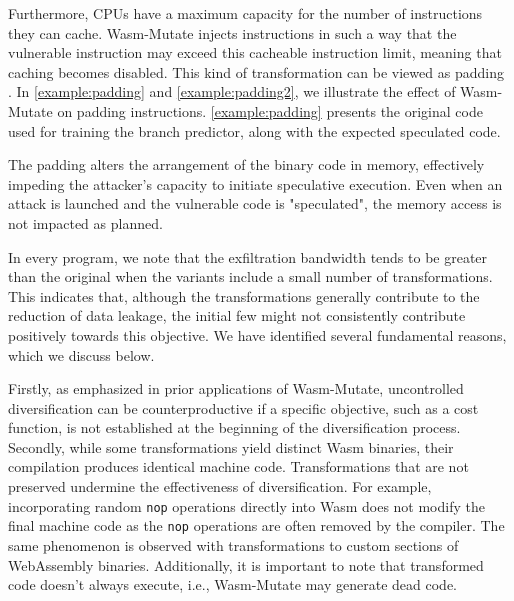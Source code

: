 \documentclass[sigplan,screen]{acmart}
\newcommand{\tool}{{\sc Wasm-Mutate}\xspace}
\newcommand{\wasm}{Wasm\xspace}
\newcommand{\Wasm}{WebAssembly\xspace}
\begin{document}
Furthermore, CPUs have a maximum capacity for the number of instructions they can cache.
\tool injects instructions in such a way that the vulnerable instruction may exceed this cacheable instruction limit, meaning that caching becomes disabled.
This kind of transformation can be viewed as padding \cite{padding}.
In \autoref{example:padding} and \autoref{example:padding2}, we illustrate the effect of \tool on padding instructions.
\autoref{example:padding} presents the original code used for training the branch predictor, along with the expected speculated code.



The padding alters the arrangement of the binary code in memory, effectively impeding the attacker's capacity to initiate speculative execution.
Even when an attack is launched and the vulnerable code is "speculated", the memory access is not impacted as planned.


In every program, we note that the exfiltration bandwidth tends to be greater than the original when the variants include a small number of transformations.
This indicates that, although the transformations generally contribute to the reduction of data leakage, the initial few might not consistently contribute positively towards this objective.
We have identified several fundamental reasons, which we discuss below.

Firstly, as emphasized in prior applications of \tool \cite{CABRERAARTEAGA2023103296}, uncontrolled diversification can be counterproductive if a specific objective, such as a cost function, is not established at the beginning of the diversification process.
Secondly, while some transformations yield distinct \wasm binaries, their compilation produces identical machine code.
Transformations that are not preserved undermine the effectiveness of diversification.
For example, incorporating random \texttt{nop} operations directly into \wasm does not modify the final machine code as the \texttt{nop} operations are often removed by the compiler.
The same phenomenon is observed with transformations to custom sections of \Wasm binaries.
Additionally, it is important to note that transformed code doesn't always execute, i.e., \tool may generate dead code.
\end{document}
